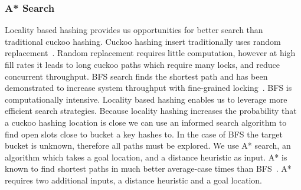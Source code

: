 


\subsubsection{A* Search} 

Locality based hashing provides us opportunities for better
search than traditional cuckoo hashing. Cuckoo hashing
insert traditionally uses random replacement~\cite{cuckoo}.
Random replacement requires little computation, however at
high fill rates it leads to long cuckoo paths which require
many locks, and reduce concurrent throughput. BFS search
finds the shortest path and has been demonstrated to
increase system throughput with fine-grained
locking~\cite{cuckoo-improvements}.  BFS is computationally
intensive. Locality based hashing enables us to leverage
more efficient search strategies. Because locality hashing
increases the probability that a cuckoo hashing location is
close we can use an informed search algorithm to find open
slots close to bucket a key hashes to. 
In the case of BFS the target bucket is unknown, therefore
all paths must be explored. We use A* search, an algorithm
which takes a goal location, and a distance heuristic as
input. A* is known to find shortest paths in much better
average-case times than BFS~\cite{}. A* requires two
additional inputs, a distance heuristic and a goal location.

